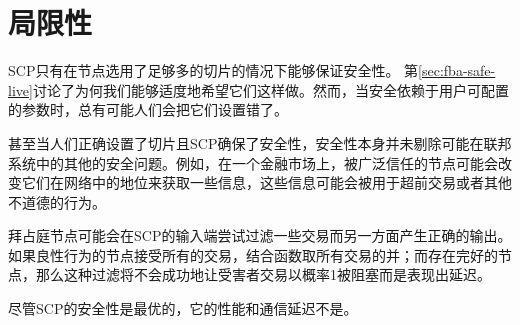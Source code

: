 \section{局限性}

SCP只有在节点选用了足够多的{\quorum}切片的情况下能够保证安全性。	第\ref{sec:fba-safe-live}讨论了为何我们能够适度地希望它们这样做。然而，当安全依赖于用户可配置的参数时，总有可能人们会把它们设置错了。

甚至当人们正确设置了{\quorum}切片且SCP确保了安全性，安全性本身并未剔除可能在联邦系统中的其他的安全问题。例如，在一个金融市场上，被广泛信任的节点可能会改变它们在网络中的地位来获取一些信息，这些信息可能会被用于超前交易或者其他不道德的行为。

拜占庭节点可能会在SCP的输入端尝试过滤一些交易而另一方面产生正确的输出。如果良性行为的节点接受所有的交易，结合函数取所有交易的并；而存在完好的节点，那么这种过滤将不会成功地让受害者交易以概率1被阻塞而是表现出延迟。

尽管SCP的安全性是最优的，它的性能和通信延迟不是。